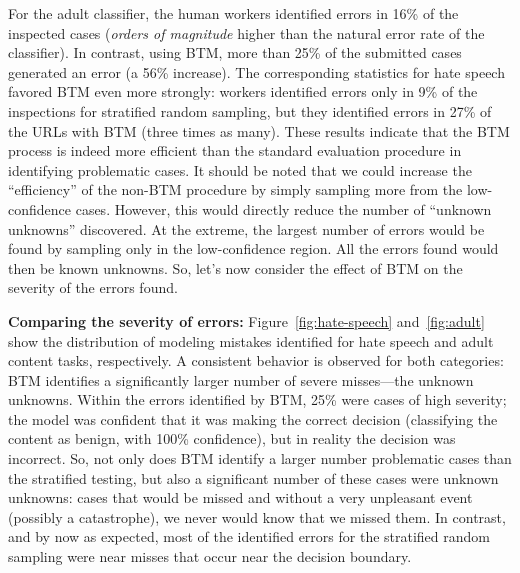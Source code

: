 For the adult classifier, the human workers identified errors in 16\%
of the inspected cases (\textit{orders of magnitude} higher than the natural error
rate of the classifier).  In contrast, using BTM, more than 25\% of
the submitted cases generated an error (a 56\% increase). The
corresponding statistics for hate speech favored BTM even more
strongly: workers identified errors only in 9\% of the inspections for
stratified random sampling, but they identified errors in 27\% of the
URLs with BTM (three times as many). 
These results indicate that the BTM process is indeed
more efficient than the standard evaluation procedure in identifying
problematic cases.  It should be noted that we could increase the
``efficiency'' of the non-BTM procedure by simply sampling more from
the low-confidence cases.  However, this would directly reduce the
number of ``unknown unknowns'' discovered.  At the extreme, the
largest number of errors would be found by sampling only in the
low-confidence region.  All the errors found would then be known
unknowns.  So, let's now consider the effect of BTM on the severity of
the errors found.

\textbf{Comparing the severity of errors:} Figure~\ref{fig:hate-speech} and~\ref{fig:adult} show the distribution of modeling mistakes identified for hate speech and adult content tasks, respectively. A consistent behavior is observed for both categories: BTM identifies a significantly larger number of severe misses---the unknown unknowns. Within the errors identified by BTM, 25\% were cases of high severity; the model was confident that it was making the correct decision (classifying the content as benign, with 100\% confidence), but in reality the decision was incorrect. So, not only does BTM identify a larger number problematic cases than the stratified testing, but also a significant number of these cases were unknown unknowns: cases that would be missed and without a very unpleasant event (possibly a catastrophe), we never would know that we missed them. In contrast, and by now as expected, most of the identified 
errors for the stratified random sampling were near misses that occur near the decision boundary.

